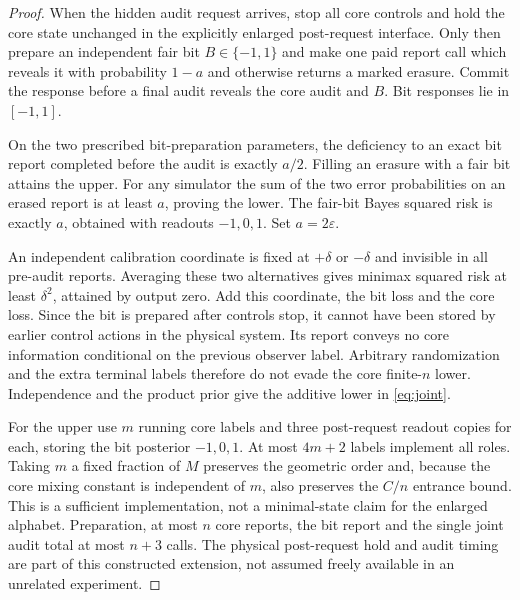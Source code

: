 \begin{proof}
When the hidden audit request arrives, stop all core controls and hold the core state unchanged in the explicitly enlarged post-request interface. Only then prepare an independent fair bit $B\in\{-1,1\}$ and make one paid report call which reveals it with probability $1-a$ and otherwise returns a marked erasure. Commit the response before a final audit reveals the core audit and $B$. Bit responses lie in $[-1,1]$.

On the two prescribed bit-preparation parameters, the deficiency to an exact bit report completed before the audit is exactly $a/2$. Filling an erasure with a fair bit attains the upper. For any simulator the sum of the two error probabilities on an erased report is at least $a$, proving the lower. The fair-bit Bayes squared risk is exactly $a$, obtained with readouts $-1,0,1$. Set $a=2\varepsilon$.

An independent calibration coordinate is fixed at $+\delta$ or $-\delta$ and invisible in all pre-audit reports. Averaging these two alternatives gives minimax squared risk at least $\delta^2$, attained by output zero. Add this coordinate, the bit loss and the core loss. Since the bit is prepared after controls stop, it cannot have been stored by earlier control actions in the physical system. Its report conveys no core information conditional on the previous observer label. Arbitrary randomization and the extra terminal labels therefore do not evade the core finite-$n$ lower. Independence and the product prior give the additive lower in \eqref{eq:joint}.

For the upper use $m$ running core labels and three post-request readout copies for each, storing the bit posterior $-1,0,1$. At most $4m+2$ labels implement all roles. Taking $m$ a fixed fraction of $M$ preserves the geometric order and, because the core mixing constant is independent of $m$, also preserves the $C/n$ entrance bound. This is a sufficient implementation, not a minimal-state claim for the enlarged alphabet. Preparation, at most $n$ core reports, the bit report and the single joint audit total at most $n+3$ calls. The physical post-request hold and audit timing are part of this constructed extension, not assumed freely available in an unrelated experiment.
\end{proof}
